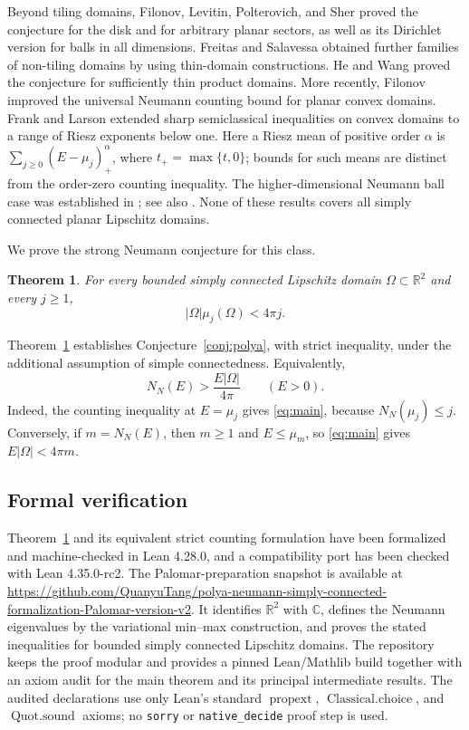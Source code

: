 \documentclass[11pt]{amsart}
\numberwithin{equation}{section}
\newtheorem{theorem}{Theorem}
\begin{document}
Beyond tiling domains, Filonov, Levitin, Polterovich, and Sher
\cite{FLPS} proved the conjecture for the disk and for arbitrary planar
sectors, as well as its Dirichlet version for balls in all dimensions.
Freitas and Salavessa \cite{FS} obtained further families of non-tiling
domains by using thin-domain constructions. He and Wang \cite{HW}
proved the conjecture for sufficiently thin product domains.
More recently, Filonov
\cite{Filonov} improved the universal Neumann counting bound for planar
convex domains. Frank and Larson \cite{FrankLarson} extended sharp
semiclassical inequalities on convex domains to a range of Riesz
exponents below one. Here a Riesz mean of positive order $\alpha$ is
$\sum_{j\ge0}(E-\mu_j)_+^\alpha$, where $t_+=\max\{t,0\}$;
bounds for such means are distinct from the order-zero counting
inequality. The higher-dimensional Neumann ball case was established
in \cite{FLPS26}; see also \cite{Li26}. None of these results covers all simply connected
planar Lipschitz domains.

We prove the strong Neumann conjecture for this class.

\begin{theorem}\label{thm:main}
For every bounded simply connected Lipschitz domain
$\Omega\subset\mathbb R^2$ and every $j\ge1$,
\begin{equation}\label{eq:main}
 |\Omega|\mu_j(\Omega)<4\pi j.
\end{equation}
\end{theorem}

Theorem~\ref{thm:main} establishes Conjecture~\ref{conj:polya}, with
strict inequality, under the additional assumption of simple
connectedness. Equivalently,
\[
 N_N(E)>\frac{E|\Omega|}{4\pi}\qquad(E>0).
\]
Indeed, the counting inequality at $E=\mu_j$ gives
\eqref{eq:main}, because $N_N(\mu_j)\le j$. Conversely, if
$m=N_N(E)$, then $m\ge1$ and $E\le\mu_m$, so \eqref{eq:main}
gives $E|\Omega|<4\pi m$.

\subsection{Formal verification}

Theorem~\ref{thm:main} and its equivalent strict counting formulation have
been formalized and machine-checked in Lean 4.28.0, and a compatibility port
has been checked with Lean 4.35.0-rc2.  The Palomar-preparation snapshot is
available at
\url{https://github.com/QuanyuTang/polya-neumann-simply-connected-formalization-Palomar-version-v2}.
It identifies $\mathbb R^2$ with $\mathbb C$, defines the Neumann
eigenvalues by the variational min--max construction, and proves the stated
inequalities for bounded simply connected Lipschitz domains.  The repository
keeps the proof modular and provides a pinned Lean/Mathlib build together
with an axiom audit for the main theorem and its principal intermediate
results.  The audited declarations use only Lean's standard
$\operatorname{propext}$, $\operatorname{Classical.choice}$, and
$\operatorname{Quot.sound}$ axioms; no \texttt{sorry} or
\texttt{native\_decide} proof step
is used.
\end{document}
